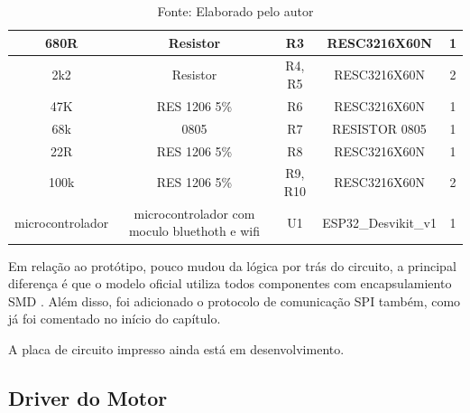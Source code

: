 \documentclass[../poliXuniversity_hospital_-USP-report.tex]{subfiles}
\begin{document}
\begin{table}[h]
\begin{adjustbox}{width=\columnwidth,center}
\begin{tabular}{|c|c|c|c|c|}
680R             & Resistor                                       & R3                         & RESC3216X60N             & 1        \\ \hline
2k2              & Resistor                                       & R4, R5                     & RESC3216X60N             & 2        \\ \hline
47K              & RES 1206 5\%                                   & R6                         & RESC3216X60N             & 1        \\ \hline
68k              & 0805                                           & R7                         & RESISTOR 0805            & 1        \\ \hline
22R              & RES 1206 5\%                                   & R8                         & RESC3216X60N             & 1        \\ \hline
100k             & RES 1206 5\%                                   & R9, R10                    & RESC3216X60N             & 2        \\ \hline
microcontrolador & microcontrolador com   moculo bluethoth e wifi & U1                         & ESP32\_Desvikit\_v1      & 1        \\ \hline

\end{tabular}
\end{adjustbox}
\centering
\caption*{Fonte: Elaborado pelo autor}
\label{Componentes Utilizados na placa de Controle}
\end{table}

Em relação ao protótipo, pouco mudou da lógica por trás do circuito, a principal diferença é que o modelo oficial utiliza todos componentes com encapsulamiento SMD \cite{SMD_def}. Além disso, foi adicionado o protocolo de comunicação SPI também, como já foi comentado no início do capítulo.

A placa de circuito impresso ainda está em desenvolvimento.

\subsection{Driver do Motor}
\end{document}
